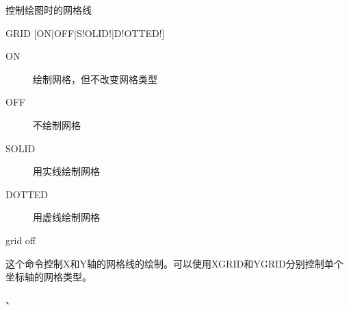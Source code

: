\label{cmd:grid}

控制绘图时的网格线

\begin{SACSTX}
GRID [ON|OFF|S!OLID!|D!OTTED!]
\end{SACSTX}

\begin{description}
\item [ON] 绘制网格，但不改变网格类型
\item [OFF] 不绘制网格
\item [SOLID] 用实线绘制网格
\item [DOTTED] 用虚线绘制网格
\end{description}

\begin{SACDFT}
grid off
\end{SACDFT}

这个命令控制X和Y轴的网格线的绘制。可以使用XGRID和YGRID分别控制单个坐标轴的网格类型。

、
